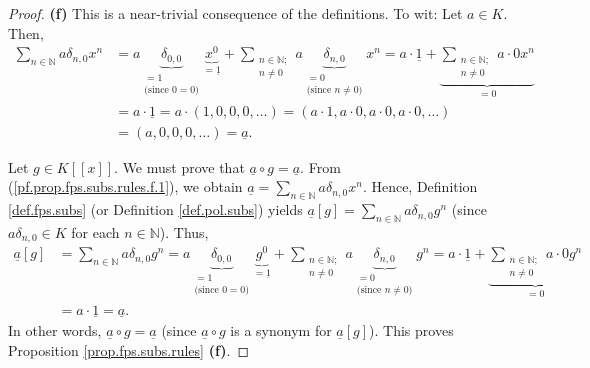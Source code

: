 \begin{proof}
\bigskip

\textbf{(f)} This is a near-trivial consequence of the definitions. To wit:
Let $a\in K$. Then,
\begin{align}
\sum_{n\in\mathbb{N}}a\delta_{n,0}x^{n}  &  =a\underbrace{\delta_{0,0}%
}_{\substack{=1\\\text{(since }0=0\text{)}}}\underbrace{x^{0}}_{=\underline{1}%
}+\sum_{\substack{n\in\mathbb{N};\\n\neq0}}a\underbrace{\delta_{n,0}%
}_{\substack{=0\\\text{(since }n\neq0\text{)}}}x^{n}=a\cdot\underline{1}%
+\underbrace{\sum_{\substack{n\in\mathbb{N};\\n\neq0}}a\cdot0x^{n}}%
_{=0}\nonumber\\
&  =a\cdot\underline{1}=a\cdot\left(  1,0,0,0,\ldots\right)  =\left(
a\cdot1,a\cdot0,a\cdot0,a\cdot0,\ldots\right) \nonumber\\
&  =\left(  a,0,0,0,\ldots\right)  =\underline{a}.
\label{pf.prop.fps.subs.rules.f.1}%
\end{align}


Let $g\in K\left[  \left[  x\right]  \right]  $. We must prove that
$\underline{a}\circ g=\underline{a}$. From (\ref{pf.prop.fps.subs.rules.f.1}),
we obtain $\underline{a}=\sum_{n\in\mathbb{N}}a\delta_{n,0}x^{n}$. Hence,
Definition \ref{def.fps.subs} (or Definition \ref{def.pol.subs}) yields
$\underline{a}\left[  g\right]  =\sum_{n\in\mathbb{N}}a\delta_{n,0}g^{n}$
(since $a\delta_{n,0}\in K$ for each $n\in\mathbb{N}$). Thus,%
\begin{align*}
\underline{a}\left[  g\right]   &  =\sum_{n\in\mathbb{N}}a\delta_{n,0}%
g^{n}=a\underbrace{\delta_{0,0}}_{\substack{=1\\\text{(since }0=0\text{)}%
}}\underbrace{g^{0}}_{=\underline{1}}+\sum_{\substack{n\in\mathbb{N};\\n\neq
0}}a\underbrace{\delta_{n,0}}_{\substack{=0\\\text{(since }n\neq0\text{)}%
}}g^{n}=a\cdot\underline{1}+\underbrace{\sum_{\substack{n\in\mathbb{N}%
;\\n\neq0}}a\cdot0g^{n}}_{=0}\\
&  =a\cdot\underline{1}=\underline{a}.
\end{align*}
In other words, $\underline{a}\circ g=\underline{a}$ (since $\underline{a}%
\circ g$ is a synonym for $\underline{a}\left[  g\right]  $). This proves
Proposition \ref{prop.fps.subs.rules} \textbf{(f)}.

\bigskip


\end{proof}
